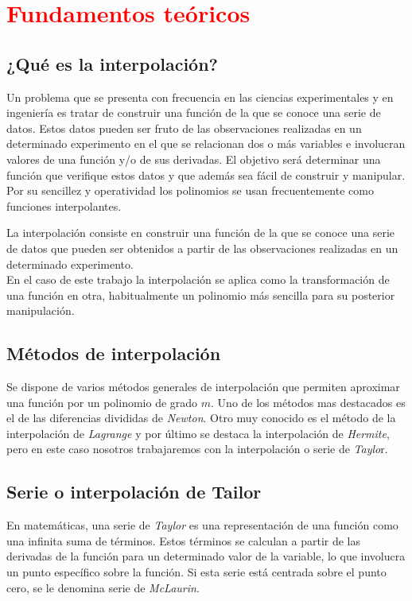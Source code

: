 \documentclass[a4paper,12pt]{article}
\begin{document}
\section{\textcolor{red}{Fundamentos teóricos}}
\subsection{¿Qué es la interpolación?} 
Un problema que se presenta con frecuencia en las ciencias experimentales y en ingeniería es tratar de construir una función de la que se conoce una serie de datos.
Estos datos pueden ser fruto de las observaciones realizadas en un determinado experimento en el que se relacionan dos o más variables e involucran valores de 
una función y/o de sus derivadas. El objetivo será determinar una función que verifique estos datos y que además sea fácil de construir y manipular. 
Por su sencillez y operatividad los polinomios se usan frecuentemente como funciones interpolantes.

La interpolación consiste en construir una función de la que se conoce una serie de datos que pueden ser obtenidos a partir de las observaciones realizadas en un determinado experimento.\\ 
En el caso de este trabajo la interpolación se aplica como la transformación de una función en otra, habitualmente un polinomio más sencilla para su posterior manipulación. 
\subsection{Métodos de interpolación}
Se dispone de varios métodos generales de interpolación que permiten aproximar una función por un polinomio de grado $m$. Uno de los métodos mas destacados es el de las diferencias divididas de {\em Newton}. 
Otro muy conocido es el método de la interpolación de {\em Lagrange} y por último se destaca la interpolación de {\em Hermite}, pero en este caso nosotros trabajaremos con la interpolación o serie de {\em Taylo}r. 
\subsection{Serie o interpolación de Tailor}
En matemáticas, una serie de {\em Taylor} es una representación de una función como una infinita suma de términos.
Estos términos se calculan a partir de las derivadas de la función para un determinado valor de la variable, lo que involucra un punto específico sobre la función. Si esta serie está centrada sobre el punto cero, 
se le denomina serie de {\em McLaurin}.
\newpage
\end{document}
